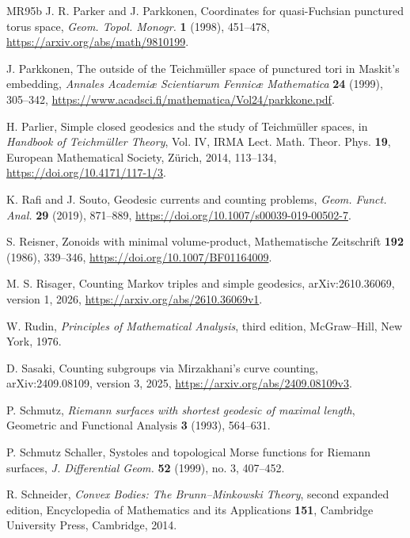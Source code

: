 \documentclass[10pt,twoside]{article}
\theoremstyle{plain}
\theoremstyle{definition}
\theoremstyle{remark}
\begin{document}
\begin{thebibliography}{MR95b}
J. R. Parker and J. Parkkonen,
Coordinates for quasi-Fuchsian punctured torus space,
\emph{Geom. Topol. Monogr.} \textbf{1} (1998), 451--478,
\url{https://arxiv.org/abs/math/9810199}.

J. Parkkonen,
The outside of the Teichm\"uller space of punctured tori in
Maskit's embedding,
\emph{Annales Academi\ae{} Scientiarum Fennic\ae{} Mathematica}
\textbf{24} (1999), 305--342,
\url{https://www.acadsci.fi/mathematica/Vol24/parkkone.pdf}.

H. Parlier,
Simple closed geodesics and the study of Teichm\"uller spaces,
in \emph{Handbook of Teichm\"uller Theory}, Vol. IV,
IRMA Lect. Math. Theor. Phys. \textbf{19}, European Mathematical Society,
Z\"urich, 2014, 113--134,
\url{https://doi.org/10.4171/117-1/3}.

K. Rafi and J. Souto,
Geodesic currents and counting problems,
\emph{Geom. Funct. Anal.} \textbf{29} (2019), 871--889,
\url{https://doi.org/10.1007/s00039-019-00502-7}.

S. Reisner,
Zonoids with minimal volume-product,
Mathematische Zeitschrift \textbf{192} (1986), 339--346,
\url{https://doi.org/10.1007/BF01164009}.

M. S. Risager,
Counting Markov triples and simple geodesics,
arXiv:2610.36069, version 1, 2026,
\url{https://arxiv.org/abs/2610.36069v1}.

W. Rudin,
\emph{Principles of Mathematical Analysis}, third edition,
McGraw--Hill, New York, 1976.

D. Sasaki,
Counting subgroups via Mirzakhani's curve counting,
arXiv:2409.08109, version 3, 2025,
\url{https://arxiv.org/abs/2409.08109v3}.

P. Schmutz,
\emph{Riemann surfaces with shortest geodesic of maximal length},
Geometric and Functional Analysis \textbf{3} (1993), 564--631.

P. Schmutz Schaller,
Systoles and topological Morse functions for Riemann surfaces,
\emph{J. Differential Geom.} \textbf{52} (1999), no. 3, 407--452.

R. Schneider,
\emph{Convex Bodies: The Brunn--Minkowski Theory}, second expanded edition,
Encyclopedia of Mathematics and its Applications \textbf{151},
Cambridge University Press, Cambridge, 2014.


\end{thebibliography}
\end{document}
